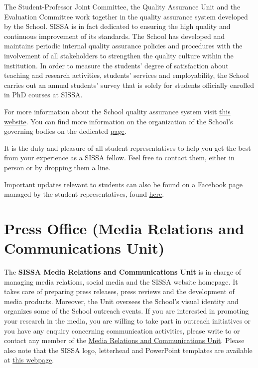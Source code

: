 \documentclass{sissavademecum}
\begin{document}
The Student-Professor Joint Committee, the Quality Assurance Unit and the Evaluation Committee work together in the quality assurance system developed by the School. SISSA is in fact dedicated to ensuring the high quality and continuous improvement of its standards. The School has developed and maintains periodic internal quality assurance policies and procedures with the involvement of all stakeholders to strengthen the quality culture within the institution. In order to measure the students' degree of satisfaction about teaching and research activities, students' services and employability, the School carries out an annual students' survey that is solely for students officially enrolled in PhD courses at SISSA. 

For more information about the School quality assurance system visit \href{https://www.sissa.it/qualita}{this website}. You can find more information on the organization of the School's governing bodies on the dedicated \href{https://www.sissa.it/general-organization}{page}.

It is the duty and pleasure of all student representatives to help you get the best from your experience as a SISSA fellow. Feel free to contact them, either in person or by dropping them a line.

Important updates relevant to students can also be found on a Facebook page managed by the student representatives, found \href{https://www.facebook.com/groups/sissastudents/}{here}.


\chapter{Press Office (Media Relations and Communications Unit)}

The \textbf{SISSA Media Relations and Communications Unit} is in charge of managing media relations, social media and the SISSA website homepage. It takes care of preparing press releases, press reviews and the development of media products. Moreover, the Unit oversees the School's visual identity and organizes some of the School outreach events. If you are interested in promoting your research in the media, you are willing to take part in outreach initiatives or you have any enquiry concerning communication activities, please write to  or contact any member of the \href{https://www.sissa.it/media-and-press}{Media Relations and Communications Unit}. Please also note that the SISSA logo, letterhead and PowerPoint templates are available at \href{https://www.sissa.it/researchers-and-sissa-staff}{this webpage}.
\end{document}
